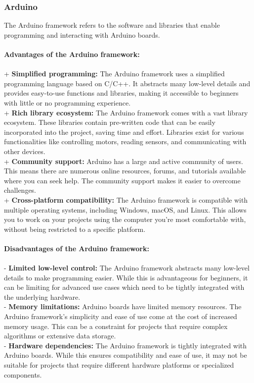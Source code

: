 \subsubsection{Arduino}
The Arduino framework refers to the software and libraries that enable programming and interacting with Arduino boards.\\\\
\textbf{Advantages of the Arduino framework: }\\\\
+ \textbf{Simplified programming:} The Arduino framework uses a simplified programming language based on C/C++. It abstracts many low-level details and provides easy-to-use functions and libraries, making it accessible to beginners with little or no programming experience. \\
+ \textbf{Rich library ecosystem:} The Arduino framework comes with a vast library ecosystem. These libraries contain pre-written code that can be easily incorporated into the project, saving time and effort. Libraries exist for various functionalities like controlling motors, reading sensors, and communicating with other devices.\\
+ \textbf{Community support:} Arduino has a large and active community of users. This means there are numerous online resources, forums, and tutorials available where you can seek help. The community support makes it easier to overcome challenges. \\
+ \textbf{Cross-platform compatibility:} The Arduino framework is compatible with multiple operating systems, including Windows, macOS, and Linux. This allows you to work on your projects using the computer you're most comfortable with, without being restricted to a specific platform. \\\\
\textbf{Disadvantages of the Arduino framework:} \\\\
- \textbf{Limited low-level control:} The Arduino framework abstracts many low-level details to make programming easier. While this is advantageous for beginners, it can be limiting for advanced use cases which need to be tightly integrated with the underlying hardware. \\
- \textbf{Memory limitations:} Arduino boards have limited memory resources. The Arduino framework's simplicity and ease of use come at the cost of increased memory usage. This can be a constraint for projects that require complex algorithms or extensive data storage. \\
- \textbf{Hardware dependencies:} The Arduino framework is tightly integrated with Arduino boards. While this ensures compatibility and ease of use, it may not be suitable for projects that require different hardware platforms or specialized components. \\
\pagebreak
